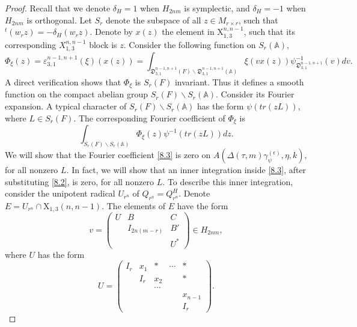 \documentclass[12pts]{amsart}
\newcommand{\BA}{{\mathbb {A}}}
\begin{document}
\begin{proof}
Recall that we denote $\delta_H=1$ when $H_{2nm}$ is symplectic, and $\delta_H=-1$ when $H_{2nm}$ is orthogonal. Let $S_r$ denote the subspace of all $z\in M_{r\times r}$, such
that ${}^t(w_rz)=-\delta_H(w_rz)$. Denote by $x(z)$ the element in
	$\mathrm{X}_{1,3}^{n,n-1}$, such that its corresponding
	$X_{1,3}^{n,n-1}$ block is $z$. Consider the following function on
	$S_r(\BA)$,
	\begin{equation}\label{8.2}
	\Phi_\xi(z)=\varepsilon_{3,1}^{n-1,n+1}(\xi)(x(z))=\int_{\mathfrak{D}_{3,1}^{n-1,n+1}(F)\backslash
		\mathfrak{D}_{3,1}^{n-1,n+1}(\BA)}\xi(vx(z))\psi_{\mathfrak{D}_{3,1}^{n-1,n+1}}^{-1}(v)dv.
	\end{equation}
A direct verification shows that $\Phi_\xi$ is $S_r(F)$ invariant.
	Thus it defines a smooth function on the compact abelian group
	$S_r(F)\backslash S_r(\BA)$. Consider its Fourier expansion. A
	typical character of $S_r(F)\backslash S_r(\BA)$ has the form
	$\psi(tr(zL))$, where $L\in S_r(F)$. The corresponding Fourier coefficient of $\Phi_\xi$ is
	\begin{equation}\label{8.3}
	\int_{S_r(F)\backslash S_r(\BA)}\Phi_\xi(z)\psi^{-1}(tr(zL))dz.
	\end{equation}
	We will show that the Fourier coefficient \eqref{8.3} is zero on
	$A(\Delta(\tau,m)\gamma_\psi^{(\epsilon)},\eta,k)$, for all nonzero $L$. In fact, we will show that an
	inner integration inside \eqref{8.3}, after substituting \eqref{8.2},
	is zero, for all nonzero $L$. To describe this inner integration,
	consider the unipotent radical $U_{r^n}$ of
	$Q_{r^n}=Q_{r^n}^H$. Denote $E=U_{r^n}\cap
	\mathrm{X}_{1,3}(n,n-1)$. The elements of $E$ have the form
	\begin{equation}\label{8.4}
	v=\begin{pmatrix}U&B&C\\&I_{2n(m-r)}&B'\\&&U^*\end{pmatrix}\in H_{2nm},
	\end{equation}
	where $U$ has the form
	\begin{equation}\label{8.5}
	U=\begin{pmatrix}I_r&x_1&\ast&\cdots&\ast\\&I_r&x_2&&\ast\\&&\cdots\\
	&&&&x_{n-1}\\&&&&I_r\end{pmatrix}.
	\end{equation}

\end{proof}
\end{document}

